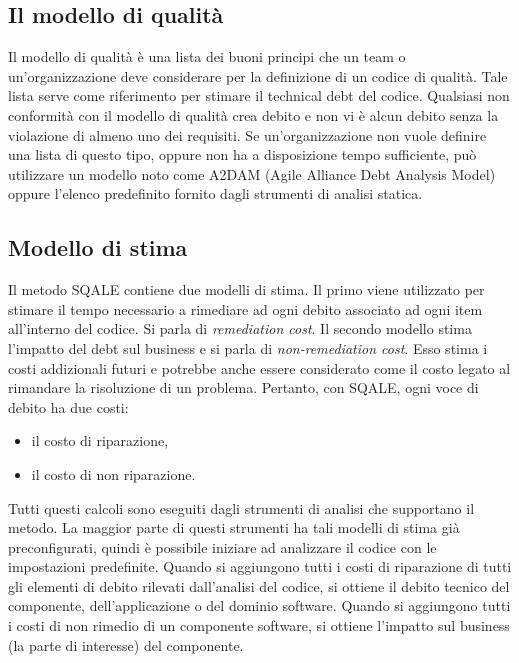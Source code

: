 \subsection{Il modello di qualità}
Il modello di qualità è una lista dei buoni principi che un team o un'organizzazione deve considerare per la definizione di un codice di qualità. Tale lista serve come riferimento per stimare il technical debt del codice. Qualsiasi non conformità con il modello di qualità crea debito e non vi è alcun debito senza la violazione di almeno uno dei requisiti. Se un'organizzazione non vuole definire una lista di questo tipo, oppure non ha a disposizione tempo sufficiente, può utilizzare un modello noto come A2DAM (Agile Alliance Debt Analysis Model) oppure l'elenco predefinito fornito dagli strumenti di analisi statica.
\subsection{Modello di stima}
Il metodo SQALE contiene due modelli di stima. Il primo viene utilizzato per stimare il tempo necessario a rimediare ad ogni debito associato ad ogni item all'interno del codice. Si parla di \textit{remediation cost}. Il secondo modello stima l'impatto del debt sul business e si parla di \textit{non-remediation cost}. Esso stima i costi addizionali futuri e  potrebbe anche essere considerato come il costo legato al rimandare la risoluzione di un problema.
Pertanto, con SQALE, ogni voce di debito ha due costi:
\begin{itemize}
	\item il costo di riparazione,
	\item il costo di non riparazione.
\end{itemize}
Tutti questi calcoli sono eseguiti dagli strumenti di analisi che supportano il metodo.
La maggior parte di questi strumenti ha tali modelli di stima già preconfigurati, quindi è possibile iniziare ad analizzare il codice con le impostazioni predefinite.
Quando si aggiungono tutti i costi di riparazione di tutti gli elementi di debito rilevati dall'analisi del codice, si ottiene il debito tecnico del componente, dell'applicazione o del dominio software. Quando si aggiungono tutti i costi di non rimedio di un componente software, si ottiene l'impatto sul business (la parte di interesse) del componente.

